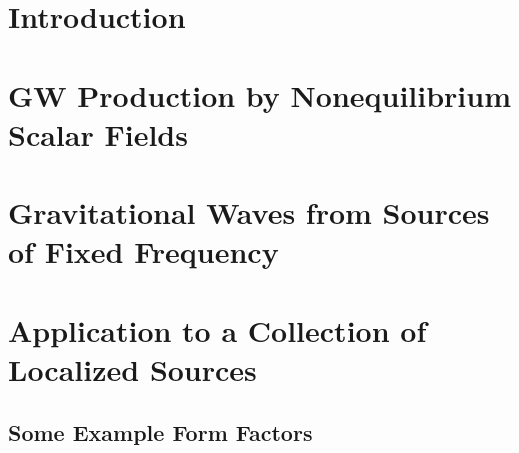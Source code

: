 \documentclass{revtex4}
\begin{document}
\section{Introduction}

\section{GW Production by Nonequilibrium Scalar Fields}

\section{Gravitational Waves from Sources of Fixed Frequency}

\section{Application to a Collection of Localized Sources}

\subsection{Some Example Form Factors}
\end{document}
